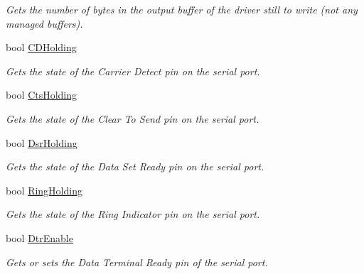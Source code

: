\begin{DoxyCompactItemize}
\begin{DoxyCompactList}\small\item\em Gets the number of bytes in the output buffer of the driver still to write (not any managed buffers). \end{DoxyCompactList}\item 
bool \mbox{\hyperlink{class_r_j_c_p_1_1_i_o_1_1_ports_1_1_native_1_1_win_native_serial_a1e55b7e746f3f937f1e781ac77e66fc9}{C\+D\+Holding}}
\begin{DoxyCompactList}\small\item\em Gets the state of the Carrier Detect pin on the serial port. \end{DoxyCompactList}\item 
bool \mbox{\hyperlink{class_r_j_c_p_1_1_i_o_1_1_ports_1_1_native_1_1_win_native_serial_a52a403357d7070da6e2db9943c4f64fe}{Cts\+Holding}}
\begin{DoxyCompactList}\small\item\em Gets the state of the Clear To Send pin on the serial port. \end{DoxyCompactList}\item 
bool \mbox{\hyperlink{class_r_j_c_p_1_1_i_o_1_1_ports_1_1_native_1_1_win_native_serial_a595390049f1a30dc59a4715736919597}{Dsr\+Holding}}
\begin{DoxyCompactList}\small\item\em Gets the state of the Data Set Ready pin on the serial port. \end{DoxyCompactList}\item 
bool \mbox{\hyperlink{class_r_j_c_p_1_1_i_o_1_1_ports_1_1_native_1_1_win_native_serial_a7d54b52a54d9117d27067351898e7bff}{Ring\+Holding}}
\begin{DoxyCompactList}\small\item\em Gets the state of the Ring Indicator pin on the serial port. \end{DoxyCompactList}\item 
bool \mbox{\hyperlink{class_r_j_c_p_1_1_i_o_1_1_ports_1_1_native_1_1_win_native_serial_a4c9fbf48b230bb81917e8157f216786b}{Dtr\+Enable}}
\begin{DoxyCompactList}\small\item\em Gets or sets the Data Terminal Ready pin of the serial port. \end{DoxyCompactList}\item 

\end{DoxyCompactItemize}
